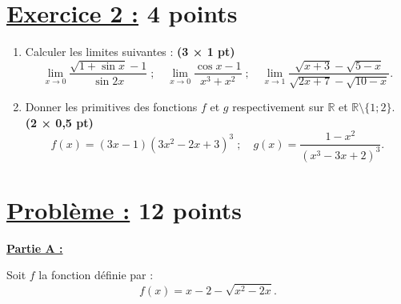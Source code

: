 \documentclass[12pt,a4paper]{article}
\begin{document}
\section*{\underline{Exercice 2 :} 4 points}

\begin{enumerate}
    \item Calculer les limites suivantes : \textbf{(3 × 1 pt)}
    \[
    \lim_{x \to 0} \frac{\sqrt{1+\sin x} - 1}{\sin 2x} \; ; \quad
    \lim_{x \to 0} \frac{\cos x - 1}{x^3 + x^2} \; ; \quad
    \lim_{x \to 1} \frac{\sqrt{x + 3} - \sqrt{5 - x}}{\sqrt{2x + 7} - \sqrt{10 - x}}.
    \]
    \item Donner les primitives des fonctions \(f\) et \(g\) respectivement sur \(\mathbb{R}\) et \(\mathbb{R} \setminus \{1; 2\}\). \textbf{(2 × 0,5 pt)}
    \[
    f(x) = (3x-1)(3x^2-2x+3)^3 \; ; \quad
    g(x) = \frac{1-x^2}{(x^3-3x+2)^3}.
    \]
\end{enumerate}

\section*{\underline{Problème :} 12 points}

\underline{\textbf{Partie A :}}

Soit \( f \) la fonction définie par :
\[
f(x) = x - 2 - \sqrt{x^2 - 2x}.
\]
\end{document}
